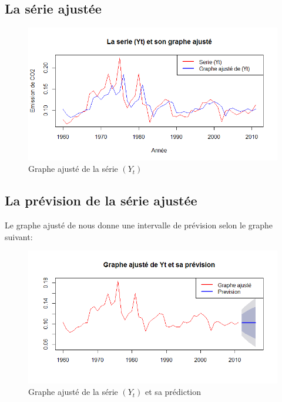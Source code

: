 \documentclass{article}
\begin{document}
\newpage

\subsection{La série ajustée}

\begin{figure}[h!]
\includegraphics[width=\linewidth]{images/Yt_ajustee.png}
\caption{Graphe ajusté de la série $(Y_t)$}
\label{fig:Yt_ajustee}
\end{figure}

\subsection{La prévision de la série ajustée}
Le graphe ajusté de nous donne une intervalle de prévision selon le graphe suivant:

\begin{figure}[h!]
\includegraphics[width=\linewidth]{images/Yt_ajustee_prediction.png}
\caption{Graphe ajusté de la série $(Y_t)$ et sa prédiction}
\label{fig:Yt_ajustee_prediction}
\end{figure}
\end{document}
